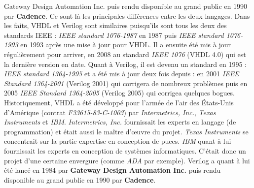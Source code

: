{Gateway Design Automation Inc.}  puis rendu disponible au grand public en 1990 par \textbf{Cadence}.
Ce sont là les principales différences entre les deux langages. Dans les faits, VHDL et Verilog sont similaires puisqu'ils sont tous les deux des standards IEEE : \textit{IEEE standard 1076-1987} 
\cite{IEEE_VHDL_87}
en 1987 puis \textit{IEEE standard 1076-1993}
\cite{IEEE_VHDL_93}
 en 1993 après une mise à jour pour VHDL. Il a ensuite été mis à jour régulièrement pour arriver, en 2008 au standard \textit{IEEE 1076}
\cite{IEEE_VHDL}
 (VHDL 4.0) qui est la dernière version en date. Quant à Verilog, il est devenu un standard en 1995 : \textit{IEEE standard 1364-1995} 
\cite{IEEE_VERILOG_1995}
et a été mis à jour deux fois depuis : en 2001  \textit{IEEE Standard 1364-2001} 
\cite{IEEE_VERILOG_2001}
(Verilog 2001) qui corrigera de nombreux problèmes puis en 2005  \textit{IEEE Standard 1364-2005}
\cite{IEEE_VERILOG_2005}
(Verilog 2005) qui corrigea quelques bogues. Historiquement, VHDL a été développé pour l'armée de l'air des États-Unis d'Amérique (contrat \textit{F33615-83-C-1003}) par \textit{Intermetrics, Inc.}, \textit{Texas Instruments} et \textit{IBM}. \textit{Intermetrics, Inc.}  fournissait les experts en langage (de programmation) et était aussi le maître d'\oe{}uvre du projet. \textit{Texas Instruments} se concentrait sur la partie expertise en conception de puces. \textit{IBM} quant à lui fournissait les experts en conception de systèmes informatiques. C'était donc un projet d'une certaine envergure (comme \textit{ADA} par exemple). Verilog a quant à lui été lancé en 1984 par \textbf{Gateway Design Automation Inc.}  puis rendu disponible au grand public en 1990 par \textbf{Cadence}.

